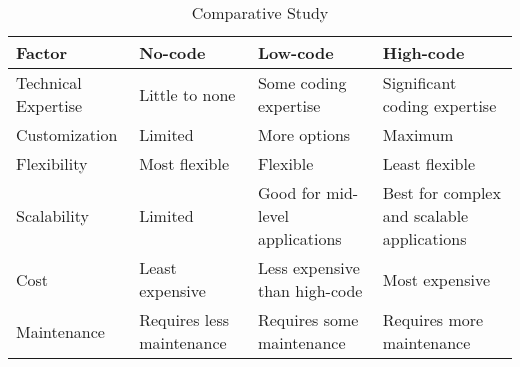 \documentclass{article}
\begin{document}
\setlength{\tabcolsep}{5pt} %
\renewcommand{\arraystretch}{1.5} %

\begin{table}[!ht]
\caption{Comparative Study}
\begin{center}
\begin{tabular}{|>{\raggedright\arraybackslash}p{1.7cm}|>{\raggedright\arraybackslash}p{1.6cm}|>{\raggedright\arraybackslash}p{1.6cm}|>{\raggedright\arraybackslash}p{1.6cm}|}
\hline
\textbf{Factor} & \textbf{No-code} & \textbf{Low-code} & \textbf{High-code} \\ \hline
Technical Expertise & Little to none & Some coding expertise & Significant coding expertise \\ \hline
Customization & Limited & More options & Maximum \\ \hline
Flexibility & Most flexible & Flexible & Least flexible \\ \hline
Scalability & Limited & Good for mid-level applications & Best for complex and scalable applications \\ \hline
Cost & Least expensive & Less expensive than high-code & Most expensive \\ \hline
Maintenance & Requires less maintenance & Requires some maintenance & Requires more maintenance \\ \hline
\end{tabular}
\end{center}
\label{compare_table}
\end{table}

\setlength{\tabcolsep}{6pt} %
\renewcommand{\arraystretch}{1.0} %
\end{document}

